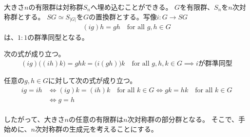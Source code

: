	大きさ$n$の有限群は対称群$S_n$へ埋め込むことができる。
	$G$を有限群、$S_n$を$n$次対称群とする。
	$SG\simeq S_{|G|}$を$G$の置換群とする。写像$i:G\to SG$
	\begin{equation*}\begin{split}
		(ig)h = gh \quad\text{for all }g,h\in G
	\end{split}\end{equation*}
	は、$1:1$の群準同型となる。
	\begin{description}\setlength{\itemsep}{-1mm} %
		\item[群準同型] 次の式が成り立つ。
		\begin{equation*}\begin{split}
			(ig)\bigl((ih)k\bigr) = ghk = \bigl(i(gh)\bigr)k
			\quad\text{for all }g,h,k\in G \implies \text{$i$が群準同型}
		\end{split}\end{equation*}
		\item[$1:1$] 任意の$g,h\in G$に対して次の式が成り立つ。
		\begin{equation*}\begin{split}
			ig = ih &\iff (ig)k=(ih)k \quad\text{for all }k\in G
			\iff gk = hk \quad\text{for all }k\in G \\
			&\iff g = h \\
		\end{split}\end{equation*}
	\end{description} %
	したがって、大きさ$n$の任意の有限群は$n$次対称群の部分群となる。
	そこで、手始めに、$n$次対称群の生成元を考えることにする。

